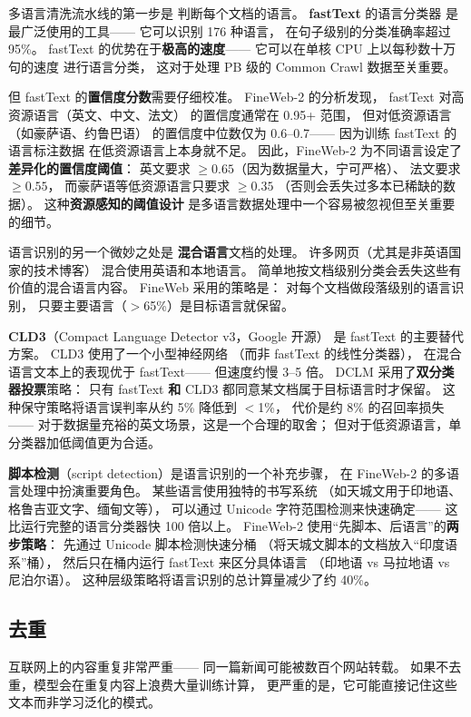 多语言清洗流水线的第一步是
判断每个文档的语言。
\textbf{fastText} 的语言分类器
是最广泛使用的工具——
它可以识别 176 种语言，
在句子级别的分类准确率超过 95\%。
fastText 的优势在于\textbf{极高的速度}——
它可以在单核 CPU 上以每秒数十万句的速度
进行语言分类，
这对于处理 PB 级的 Common Crawl 数据至关重要。

但 fastText 的\textbf{置信度分数}需要仔细校准。
FineWeb-2 的分析发现，
fastText 对高资源语言（英文、中文、法文）
的置信度通常在 0.95+ 范围，
但对低资源语言（如豪萨语、约鲁巴语）
的置信度中位数仅为 0.6--0.7——
因为训练 fastText 的语言标注数据
在低资源语言上本身就不足。
因此，FineWeb-2 为不同语言设定了
\textbf{差异化的置信度阈值}：
英文要求 $\geq 0.65$（因为数据量大，宁可严格）、
法文要求 $\geq 0.55$，
而豪萨语等低资源语言只要求 $\geq 0.35$
（否则会丢失过多本已稀缺的数据）。
这种\textbf{资源感知的阈值设计}
是多语言数据处理中一个容易被忽视但至关重要的细节。

语言识别的另一个微妙之处是
\textbf{混合语言}文档的处理。
许多网页（尤其是非英语国家的技术博客）
混合使用英语和本地语言。
简单地按文档级别分类会丢失这些有价值的混合语言内容。
FineWeb 采用的策略是：
对每个文档做段落级别的语言识别，
只要主要语言（$>$65\%）是目标语言就保留。

\textbf{CLD3}（Compact Language Detector v3，Google 开源）
是 fastText 的主要替代方案。
CLD3 使用了一个小型神经网络
（而非 fastText 的线性分类器），
在混合语言文本上的表现优于 fastText——
但速度约慢 3--5 倍。
DCLM 采用了\textbf{双分类器投票}策略：
只有 fastText \textbf{和} CLD3 都同意某文档属于目标语言时才保留。
这种保守策略将语言误判率从约 5\% 降低到 $<$1\%，
代价是约 8\% 的召回率损失——
对于数据量充裕的英文场景，这是一个合理的取舍；
但对于低资源语言，单分类器加低阈值更为合适。

\textbf{脚本检测}（script detection）是语言识别的一个补充步骤，
在 FineWeb-2 的多语言处理中扮演重要角色。
某些语言使用独特的书写系统
（如天城文用于印地语、格鲁吉亚文字、缅甸文等），
可以通过 Unicode 字符范围检测来快速确定——
这比运行完整的语言分类器快 100 倍以上。
FineWeb-2 使用``先脚本、后语言''的\textbf{两步策略}：
先通过 Unicode 脚本检测快速分桶
（将天城文脚本的文档放入``印度语系''桶），
然后只在桶内运行 fastText 来区分具体语言
（印地语 vs 马拉地语 vs 尼泊尔语）。
这种层级策略将语言识别的总计算量减少了约 40\%。

\subsection{去重}

互联网上的内容重复非常严重——
同一篇新闻可能被数百个网站转载。
如果不去重，模型会在重复内容上浪费大量训练计算，
更严重的是，它可能直接记住这些文本而非学习泛化的模式。

